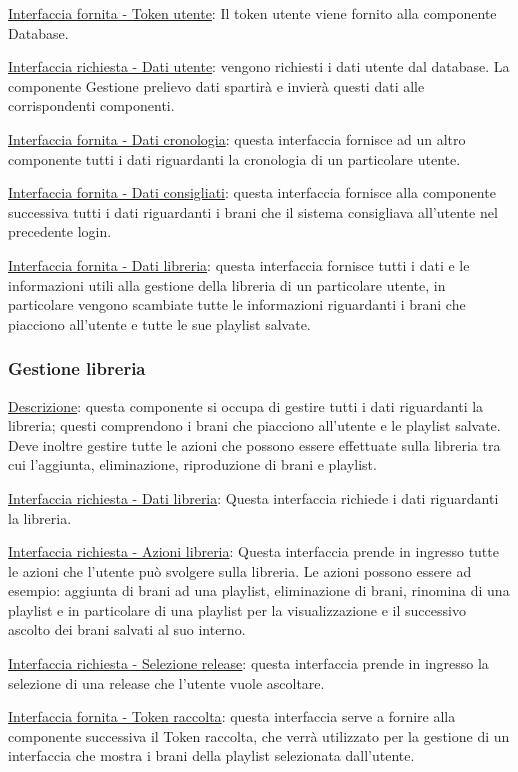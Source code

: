 \documentclass[a4paper,12pt]{article}
\begin{document}
\underline{Interfaccia fornita - Token utente}: Il token utente viene fornito alla componente Database.

\underline{Interfaccia richiesta - Dati utente}: vengono richiesti i dati utente dal database. La componente Gestione prelievo dati spartirà e invierà questi dati alle corrispondenti componenti.

\underline{Interfaccia fornita - Dati cronologia}: questa interfaccia fornisce ad un altro componente tutti i dati riguardanti la cronologia di un particolare utente.

\underline{Interfaccia fornita - Dati consigliati}: questa interfaccia fornisce alla componente successiva tutti i dati riguardanti i brani che il sistema consigliava all’utente nel precedente login.  

\underline{Interfaccia fornita - Dati libreria}: questa interfaccia fornisce tutti i dati e le informazioni utili alla gestione della libreria di un particolare utente, in particolare vengono scambiate tutte le informazioni riguardanti i brani che piacciono all’utente e tutte le sue playlist salvate.

\subsubsection{Gestione libreria }

\underline{Descrizione}: questa componente si occupa di gestire tutti i dati riguardanti la libreria; questi comprendono i brani che piacciono all’utente e le playlist salvate. Deve inoltre gestire tutte le azioni che possono essere effettuate sulla libreria tra cui l’aggiunta, eliminazione, riproduzione di brani e playlist.

\underline{Interfaccia richiesta - Dati libreria}: Questa interfaccia richiede i dati riguardanti la libreria.

\underline{Interfaccia richiesta - Azioni libreria}: Questa interfaccia prende in ingresso tutte le azioni che l’utente può svolgere sulla libreria. Le azioni possono essere ad esempio: aggiunta di brani ad una playlist, eliminazione di brani, rinomina di una playlist e in particolare di una playlist per la visualizzazione e il successivo ascolto dei brani salvati al suo interno.

\underline{Interfaccia richiesta - Selezione release}: questa interfaccia prende in ingresso la selezione di una release che l’utente vuole ascoltare.

\underline{Interfaccia fornita - Token raccolta}: questa interfaccia serve a fornire alla componente successiva il Token raccolta, che verrà utilizzato per la gestione di un interfaccia che mostra i brani della playlist selezionata dall’utente.
\end{document}
